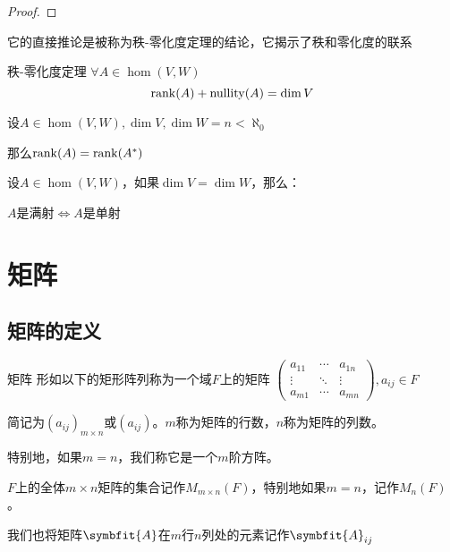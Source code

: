 \documentclass[12pt, a4paper, oneside, UTF8]{ctexbook}
\begin{document}
\begin{para}{0}
\begin{proof}
						\end{proof}
						它的直接推论是被称为秩-零化度定理的结论，它揭示了秩和零化度的联系
						\begin{them}{秩-零化度定理}{}
							$\forall A \in \hom(V,W)$
							\begin{equation}
								\operatorname{rank}(A)+\operatorname{nullity}(A) = \dim V
							\end{equation}
						\end{them}
						\begin{proposition}
							设$A \in \hom(V,W),\dim V,\dim W = n < \aleph_0$

							那么$\operatorname{rank}(A)=\operatorname{rank}(A^*)$
						\end{proposition}
					\point{}
						\begin{proposition}
							设$A \in \hom(V,W)$，如果$\dim V=\dim W$，那么：

							$A$是满射$\Leftrightarrow A$是单射
						\end{proposition}
				\end{para}
	\section{矩阵}
		\subsection{矩阵的定义}
			\begin{defn}{矩阵}{}
				形如以下的矩形阵列称为一个域$F$上的矩阵
				$\begin{pmatrix}
					a_{11} & \cdots & a_{1n} \\
					\vdots & \ddots & \vdots \\
					a_{m1} & \cdots & a_{mn}
				\end{pmatrix},a_{ij} \in F$

				简记为$(a_{ij})_{m \times n}$或$(a_{ij})$。$m$称为矩阵的行数，$n$称为矩阵的列数。

				特别地，如果$m=n$，我们称它是一个$m$阶方阵。

				$F$上的全体$m \times n$矩阵的集合记作$M_{m \times n} (F)$，特别地如果$m=n$，记作$M_n (F)$。

				我们也将矩阵$\symbfit{A}$在$m$行$n$列处的元素记作$\symbfit{A}_{ij}$
			\end{defn}
\end{document}
